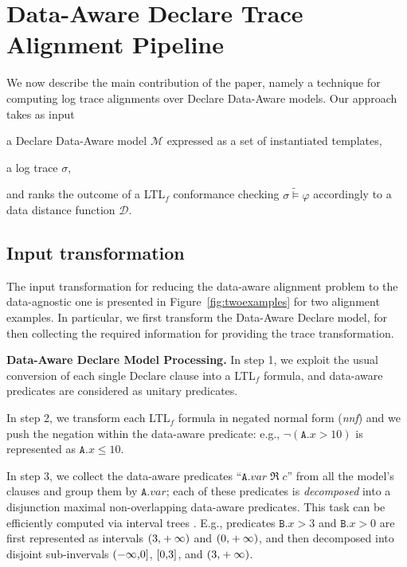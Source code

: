 

\section{Data-Aware Declare Trace Alignment Pipeline}\label{sec:dadtap}
We now describe the main contribution of the paper, namely a technique for computing log trace alignments over Declare Data-Aware models. Our approach takes as input \begin{enumerate*}[label=\emph{\alph*})]
	\item a Declare Data-Aware model $\mathcal{M}$ expressed as a set of instantiated templates,
	\item a log trace $\sigma$,
\end{enumerate*} and ranks the outcome of a LTL$_f$ conformance checking $\sigma\tilde{\vDash}\varphi$ accordingly to a data distance function $\mathcal{D}$.

\subsection{Input transformation}
The input transformation for reducing the data-aware alignment problem to the data-agnostic one is presented in Figure~\ref{fig:twoexamples} for two alignment examples. In particular, we first transform the Data-Aware Declare model, for then collecting the required information for providing the trace transformation.

\textbf{Data-Aware Declare Model Processing.} In step 1, we exploit the usual conversion of each single Declare clause into a LTL$_f$ formula, and data-aware predicates are considered as unitary predicates. 

In step 2, we transform each LTL$_f$ formula in negated normal form (\textit{nnf}) and we push the negation within the data-aware predicate: e.g., $\neg(\texttt{A}.x>10)$ is represented as $\texttt{A}.x\leq 10$.

In step 3, we collect the data-aware predicates ``$\texttt{A}.\textit{var}\;\Re\;c$'' from all the model's clauses and group them by $\texttt{A}.\textit{var}$; each of these predicates is \textit{decomposed} into a disjunction maximal non-overlapping data-aware predicates. This task can be efficiently computed via interval trees \cite{inttree}. E.g., predicates $\texttt{B}.x>3$ and $\texttt{B}.x>0$ are first represented as intervals $\interval({3,+\infty})$ and $\interval({0,+\infty})$, and then decomposed into disjoint sub-invervals $\interval({-\infty,0}]$, $\interval[{0,3}]$, and $\interval({3,+\infty})$. 

